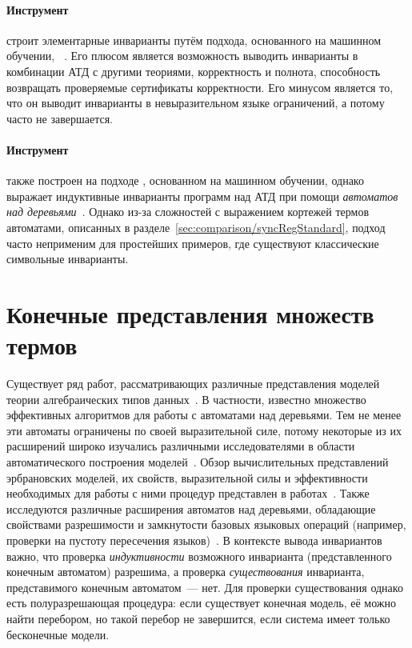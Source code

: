 \paragraph{Инструмент \hoice{}~\cite{10.1007/978-3-030-02768-1_8}} строит элементарные инварианты путём подхода, основанного на машинном обучении, \ice{}~\cite{10.1007/978-3-319-08867-9_5}.
Его плюсом является возможность выводить инварианты в комбинации АТД с другими теориями, корректность и полнота, способность возвращать проверяемые сертификаты корректности.
Его минусом является то, что он выводит инварианты в невыразительном языке ограничений, а потому часто не завершается.

\paragraph{Инструмент \rchc{}~\cite{haude2020}} также построен на подходе \ice{}, основанном на машинном обучении, однако выражает индуктивные инварианты программ над АТД при помощи \emph{автоматов над деревьями}~\cite{tata}.
Однако из-за сложностей с выражением кортежей термов автоматами, описанных в разделе~\cref{sec:comparison/syncRegStandard}, подход часто неприменим для простейших примеров, где существуют классические символьные инварианты.

\section{Конечные представления множеств термов}\label{sec:relatedWork/modelBuilding}
Существует ряд работ, рассматривающих различные представления моделей теории алгебраических типов данных~\cite{fermuller2007model,fermuller2005model,teucke2019expressivity,gramlich2002algorithmic}.
В частности, известно множество эффективных алгоритмов для работы с автоматами над деревьями.
Тем не менее эти автоматы ограничены по своей выразительной силе, потому некоторые из их расширений широко изучались различными исследователями в области автоматического построения моделей~\cite{caferra2013automated}.
Обзор вычислительных представлений эрбрановских моделей, их свойств, выразительной силы и эффективности необходимых для работы с ними процедур представлен в работах~\cite{matzinger1998computational, matzinger2000computational}.
Также исследуются различные расширения автоматов над деревьями, обладающие свойствами разрешимости и замкнутости базовых языковых операций (например, проверки на пустоту пересечения языков)~\cite{chabin2007visibly, gouranton2001synchronized, limet2001weakly, chabin2006synchronized, jacquemard2009rigid, engelfriet2017multiple}.
В контексте вывода инвариантов важно, что проверка \emph{индуктивности} возможного инварианта (представленного конечным автоматом) разрешима, а проверка \emph{существования} инварианта, представимого конечным автоматом~--- нет.
Для проверки существования однако есть полуразрешающая процедура: если существует конечная модель, её можно найти перебором, но такой перебор не завершится, если система имеет только бесконечные модели.
